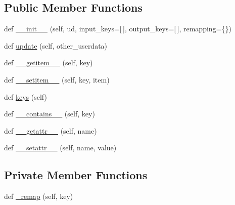 \subsection*{Public Member Functions}
\begin{DoxyCompactItemize}
\item 
def \hyperlink{classsmacc__viewer_1_1smacc__user__data_1_1Remapper_acbcf820c469565f932cf8352ce6c378d}{\+\_\+\+\_\+init\+\_\+\+\_\+} (self, ud, input\+\_\+keys=\mbox{[}$\,$\mbox{]}, output\+\_\+keys=\mbox{[}$\,$\mbox{]}, remapping=\{\})
\item 
def \hyperlink{classsmacc__viewer_1_1smacc__user__data_1_1Remapper_a81f15d6d84514b34508192ef3044b8db}{update} (self, other\+\_\+userdata)
\item 
def \hyperlink{classsmacc__viewer_1_1smacc__user__data_1_1Remapper_a88464157e42e05aff80d4a1af032e02e}{\+\_\+\+\_\+getitem\+\_\+\+\_\+} (self, key)
\item 
def \hyperlink{classsmacc__viewer_1_1smacc__user__data_1_1Remapper_a2d4951f6bc227cc985c16b2ee626410b}{\+\_\+\+\_\+setitem\+\_\+\+\_\+} (self, key, item)
\item 
def \hyperlink{classsmacc__viewer_1_1smacc__user__data_1_1Remapper_ac20a5f5b0ac2097f3a32a0a353fd81b3}{keys} (self)
\item 
def \hyperlink{classsmacc__viewer_1_1smacc__user__data_1_1Remapper_a3392df4b0e9453aef70ea926270a344e}{\+\_\+\+\_\+contains\+\_\+\+\_\+} (self, key)
\item 
def \hyperlink{classsmacc__viewer_1_1smacc__user__data_1_1Remapper_a5a7d7d40d5eb65e1579d915c58bad9c7}{\+\_\+\+\_\+getattr\+\_\+\+\_\+} (self, name)
\item 
def \hyperlink{classsmacc__viewer_1_1smacc__user__data_1_1Remapper_a516a72d75ed0e1d08e61914fda984d01}{\+\_\+\+\_\+setattr\+\_\+\+\_\+} (self, name, value)
\end{DoxyCompactItemize}
\subsection*{Private Member Functions}
\begin{DoxyCompactItemize}
\item 
def \hyperlink{classsmacc__viewer_1_1smacc__user__data_1_1Remapper_a469091d483b029bbb5fe1200d6042028}{\+\_\+remap} (self, key)
\end{DoxyCompactItemize}
